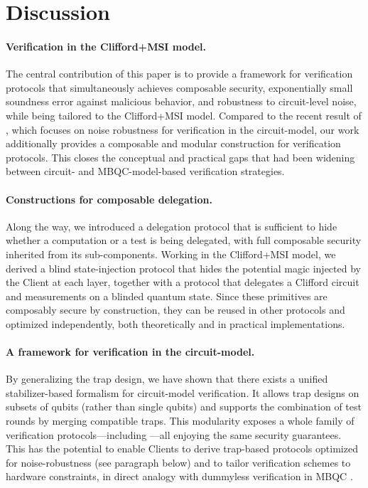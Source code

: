 
\section{Discussion}
\label{section:Discussion}

\paragraph{Verification in the Clifford+MSI model.}
The central contribution of this paper is to provide a framework for verification protocols that simultaneously achieves composable security, exponentially small soundness error against malicious behavior, and robustness to circuit-level noise, while being tailored to the Clifford+MSI model.
Compared to the recent result of \cite{BN25noise}, which focuses on noise robustness for verification in the circuit-model, our work additionally provides a composable and modular construction for verification protocols.
This closes the conceptual and practical gaps that had been widening between circuit- and MBQC-model-based verification strategies.

\paragraph{Constructions for composable delegation.}
Along the way, we introduced a delegation protocol that is sufficient to hide whether a computation or a test is being delegated, with full composable security inherited from its sub-components. Working in the Clifford+MSI model, we derived a blind state-injection protocol that hides the potential magic injected by the Client at each layer, together with a protocol that delegates a Clifford circuit and measurements on a blinded quantum state. Since these primitives are composably secure by construction, they can be reused in other protocols and optimized independently, both theoretically and in practical implementations.

\paragraph{A framework for verification in the circuit-model.}
By generalizing the trap design, we have shown that there exists a unified stabilizer-based formalism for circuit-model verification. It allows trap designs on subsets of qubits (rather than single qubits) and supports the combination of test rounds by merging compatible traps. This modularity exposes a whole family of verification protocols—including \cite{B18how,BN25noise}—all enjoying the same security guarantees. This has the potential to enable Clients to derive trap-based protocols optimized for noise-robustness (see paragraph below) and to tailor verification schemes to hardware constraints, in direct analogy with dummyless verification in MBQC \cite{KKLM23asymmetric}.


